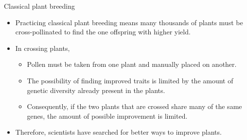 \documentclass[
  ignorenonframetext,
  aspectratio=169]{beamer}
\providecommand{\tightlist}{%
  \setlength{\itemsep}{0pt}\setlength{\parskip}{0pt}}
\begin{document}
\begin{frame}{Classical plant breeding}
\protect\hypertarget{classical-plant-breeding}{}
\begin{itemize}
\tightlist
\item
  Practicing classical plant breeding means many thousands of plants
  must be cross-pollinated to find the one offspring with higher yield.
\item
  In crossing plants,

  \begin{itemize}
  \tightlist
  \item
    Pollen must be taken from one plant and manually placed on another.
  \item
    The possibility of finding improved traits is limited by the amount
    of genetic diversity already present in the plants.
  \item
    Consequently, if the two plants that are crossed share many of the
    same genes, the amount of possible improvement is limited.
  \end{itemize}
\item
  Therefore, scientists have searched for better ways to improve plants.
\end{itemize}
\end{frame}
\end{document}

